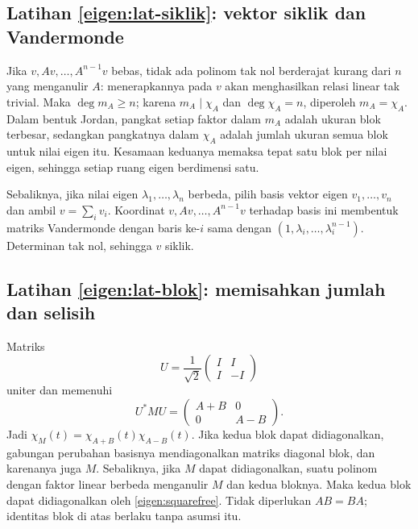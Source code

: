 \subsection*{Latihan \ref{eigen:lat-siklik}: vektor siklik dan Vandermonde}
Jika $v,Av,\ldots,A^{n-1}v$ bebas, tidak ada polinom tak nol
berderajat kurang dari $n$ yang menganulir $A$: menerapkannya pada $v$
akan menghasilkan relasi linear tak trivial.
Maka $\deg m_A\ge n$; karena $m_A\mid\chi_A$ dan $\deg\chi_A=n$,
diperoleh $m_A=\chi_A$.
Dalam bentuk Jordan, pangkat setiap faktor dalam $m_A$ adalah ukuran
blok terbesar, sedangkan pangkatnya dalam $\chi_A$ adalah jumlah
ukuran semua blok untuk nilai eigen itu. Kesamaan keduanya memaksa
tepat satu blok per nilai eigen, sehingga setiap ruang eigen berdimensi satu.

Sebaliknya, jika nilai eigen $\lambda_1,\ldots,\lambda_n$ berbeda,
pilih basis vektor eigen $v_1,\ldots,v_n$ dan ambil $v=\sum_i v_i$.
Koordinat $v,Av,\ldots,A^{n-1}v$ terhadap basis ini membentuk matriks
Vandermonde dengan baris ke-$i$ sama dengan
$(1,\lambda_i,\ldots,\lambda_i^{n-1})$.
Determinan tak nol, sehingga $v$ siklik.

\subsection*{Latihan \ref{eigen:lat-blok}: memisahkan jumlah dan selisih}
Matriks
\[
    U=\frac1{\sqrt2}\begin{pmatrix}I&I\\I&-I\end{pmatrix}
\]
uniter dan memenuhi
\[
    U^*MU=\begin{pmatrix}A+B&0\\0&A-B\end{pmatrix}.
\]
Jadi $\chi_M(t)=\chi_{A+B}(t)\chi_{A-B}(t)$.
Jika kedua blok dapat didiagonalkan, gabungan perubahan basisnya
mendiagonalkan matriks diagonal blok, dan karenanya juga $M$.
Sebaliknya, jika $M$ dapat didiagonalkan, suatu polinom dengan faktor
linear berbeda menganulir $M$ dan kedua bloknya. Maka kedua blok
dapat didiagonalkan oleh \autoref{eigen:squarefree}.
Tidak diperlukan $AB=BA$; identitas blok di atas berlaku tanpa asumsi itu.

\fi
